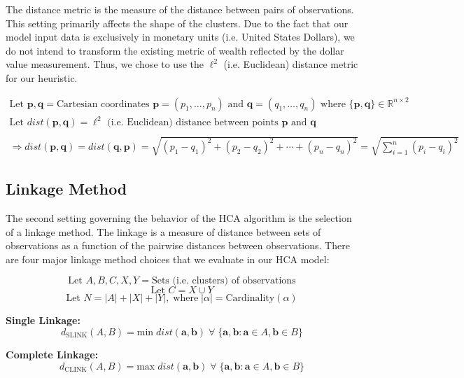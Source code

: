 \documentclass[../main.tex]{subfiles}
\begin{document}
The distance metric is the measure of the distance between pairs of observations. This setting primarily affects the shape of the clusters. Due to the fact that our model input data is exclusively in monetary units (i.e. United States Dollars), we do not intend to transform the existing metric of wealth reflected by the dollar value measurement. Thus, we chose to use the $\ell^2$ (i.e. Euclidean) distance metric for our heuristic.

\begin{gather*}
    \text{Let $\boldsymbol{p}, \boldsymbol{q}$} = \text{Cartesian coordinates $\boldsymbol{p} = (p_1, \ldots, p_n)$ and $\boldsymbol{q} = (q_1, \ldots, q_n)$ where $\{\boldsymbol{p}, \boldsymbol{q}\} \in \mathbb{R}^{n \times 2}$} \\
    \text{Let $dist(\boldsymbol{p},\boldsymbol{q})$} = \text{$\ell^2$ (i.e. Euclidean) distance between points $\boldsymbol{p}$ and $\boldsymbol{q}$} \\
    \\
    \Rightarrow dist(\boldsymbol{p}, \boldsymbol{q}) = dist(\boldsymbol{q}, \boldsymbol{p})
    = \sqrt{(p_1 - q_1)^2 + (p_2 - q_2)^2 + \cdots + (p_n - q_n)^2}
    = \sqrt{\sum_{i=1}^n (p_i - q_i)^2}
\end{gather*}

\subsection{Linkage Method}

The second setting governing the behavior of the HCA algorithm is the selection of a linkage method. The linkage is a measure of distance between sets of observations as a function of the pairwise distances between observations. There are four major linkage method choices that we evaluate in our HCA model:


    $$ \text{Let $A, B, C, X, Y$} = \text{Sets (i.e. clusters) of observations} $$
    $$ \text{Let $C$} = X \cup Y $$
    $$ \text{Let $N$} = |A| + |X| + |Y|, \; \text{where} \; |\alpha| = \text{Cardinality}(\alpha) $$
    
\hspace{7em} \textbf{Single Linkage:}
        $$ d_\text{SLINK}(A, B) = \text{min} \; dist(\boldsymbol{a}, \boldsymbol{b})  \; \forall \; \{ \boldsymbol{a}, \boldsymbol{b} : \boldsymbol{a} \in A, \boldsymbol{b} \in B \} $$
    
\hspace{7em} \textbf{Complete Linkage:}
        $$ d_\text{CLINK}(A, B) = \text{max} \; dist(\boldsymbol{a}, \boldsymbol{b})  \; \forall \; \{ \boldsymbol{a}, \boldsymbol{b} : \boldsymbol{a} \in A, \boldsymbol{b} \in B \} $$
    
\end{document}
